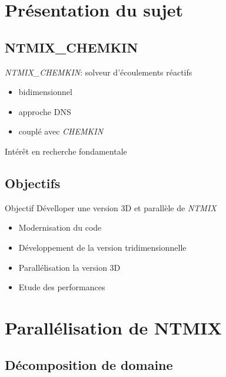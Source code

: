 \documentclass{beamer}
\begin{document}
%
%
\section{Présentation du sujet}
\subsection{NTMIX\_CHEMKIN}
\begin{frame}
  \textit{NTMIX\_CHEMKIN}: solveur d'écoulements réactifs
  \begin{itemize}
  \item bidimensionnel
  \item approche DNS
  \item couplé avec \textit{CHEMKIN}
  \end{itemize}
  Intérêt en recherche fondamentale
  
\end{frame}


\subsection{Objectifs}
\begin{frame}

  \begin{block}{Objectif}
    Dévelloper une version 3D et parallèle de \textit{NTMIX}
  \end{block}
  \begin{itemize}
  \item Modernisation du code
  \item Développement de la version tridimensionnelle
  \item Parallélisation la version 3D
  \item Etude des performances
  \end{itemize} 
\end{frame}


%
%

\section{Parallélisation de NTMIX}
\subsection{Décomposition de domaine}
\end{document}
